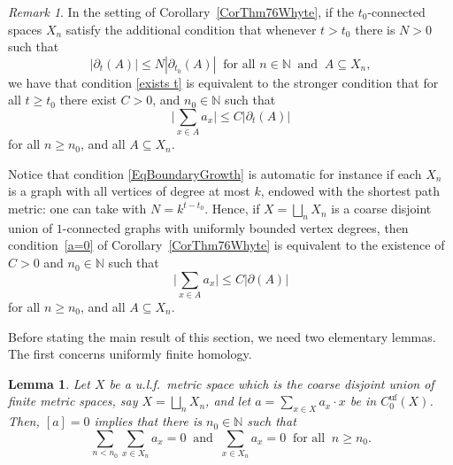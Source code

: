 \documentclass[11pt]{amsart}
\newcommand{\N}{\mathbb{N}}
\newcommand{\bbN}{\mathbb{N}}
\numberwithin{equation}{section}
\newtheorem{lemma}[theorem]{Lemma}
\theoremstyle{definition}
\theoremstyle{remark}
\newtheorem{remark}[theorem]{Remark}
\newcommand{\ri}{\partial}
\numberwithin{equation}{section}
\begin{document}
\begin{remark}\label{rem:graphsgivet1}
In the setting of Corollary~\ref{CorThm76Whyte}, if the $t_0$-connected spaces $X_n$ satisfy the additional condition that whenever $t>t_0$ there is $N>0$ such that \begin{equation}\label{EqBoundaryGrowth}|\partial_{t}(A)|\leq N|\partial_{t_0}(A)|\ \text{ for all }n\in\bbN \ \text{ and }\ A\subseteq X_n,\end{equation} we have that condition \eqref{exists t}  is equivalent to the stronger condition that for all $t\geq t_0$ there exist $C>0$, and $n_0\in\N$ such that 
 \[
 \Bigg|\sum_{x\in A}a_x\Bigg|\leq C|\ri_t(A)| 
 \]
 for all $n\geq n_0$, and all $A\subseteq X_n$.

Notice that condition \eqref{EqBoundaryGrowth}  is automatic for instance if  each $X_n$ is a graph with all vertices of degree at most $k$, endowed with the shortest path metric: one can take with $N=k^{t-t_0}$. Hence, if $X=\bigsqcup_n X_n$ is a coarse disjoint union of $1$-connected graphs with uniformly bounded vertex degrees, then condition~\eqref{a=0} of Corollary~\ref{CorThm76Whyte} is equivalent to  the existence of  $C>0$ and $n_0\in\N$ such that 
 \[
 \Bigg|\sum_{x\in A}a_x\Bigg|\leq C|\ri(A)| 
 \]
 for all $n\geq n_0$, and all $A\subseteq X_n$.

\end{remark}


Before stating the main result of this section, we need two elementary lemmas.  The first concerns uniformly finite homology.
 

\begin{lemma}\label{fin vanish inf}
Let $X$ be a u.l.f.\ metric space which is the coarse disjoint union of finite metric spaces, say $X=\bigsqcup_nX_n$, and let $a=\sum_{x\in X}a_x\cdot x$ be in $ C^{\textrm{uf}}_0(X)$. Then, $[a]=0$ implies that there is $n_0\in\N$ such that 
\begin{equation}\label{sums}
\sum_{n<n_0}\sum_{x\in X_n}a_x=0\ \text{ and }\ \sum_{x\in X_n}a_x=0\ \text{ for all }\ n\geq n_0.
\end{equation}
\end{lemma}
\end{document}
